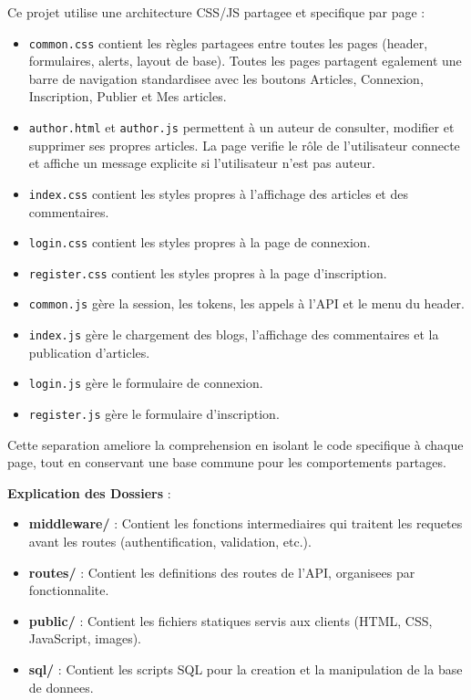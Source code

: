 \documentclass[a4paper,12pt]{book}
\begin{document}
Ce projet utilise une architecture CSS/JS partagee et specifique par page :
\begin{itemize}
    \item \texttt{common.css} contient les règles partagees entre toutes les pages (header, formulaires, alerts, layout de base). Toutes les pages partagent egalement une barre de navigation standardisee avec les boutons Articles, Connexion, Inscription, Publier et Mes articles.
    \item \texttt{author.html} et \texttt{author.js} permettent à un auteur de consulter, modifier et supprimer ses propres articles. La page verifie le rôle de l'utilisateur connecte et affiche un message explicite si l'utilisateur n'est pas auteur.
    \item \texttt{index.css} contient les styles propres à l'affichage des articles et des commentaires.
    \item \texttt{login.css} contient les styles propres à la page de connexion.
    \item \texttt{register.css} contient les styles propres à la page d'inscription.
    \item \texttt{common.js} gère la session, les tokens, les appels à l'API et le menu du header.
    \item \texttt{index.js} gère le chargement des blogs, l'affichage des commentaires et la publication d'articles.
    \item \texttt{login.js} gère le formulaire de connexion.
    \item \texttt{register.js} gère le formulaire d'inscription.
\end{itemize}
Cette separation ameliore la comprehension en isolant le code specifique à chaque page, tout en conservant une base commune pour les comportements partages.

\begin{architecturebox}
    \textbf{Explication des Dossiers} :
    \begin{itemize}
        \item \textbf{middleware/} : Contient les fonctions intermediaires qui traitent les requetes avant les routes (authentification, validation, etc.).
        \item \textbf{routes/} : Contient les definitions des routes de l'API, organisees par fonctionnalite.
        \item \textbf{public/} : Contient les fichiers statiques servis aux clients (HTML, CSS, JavaScript, images).
        \item \textbf{sql/} : Contient les scripts SQL pour la creation et la manipulation de la base de donnees.
    \end{itemize}
\end{architecturebox}
\end{document}
